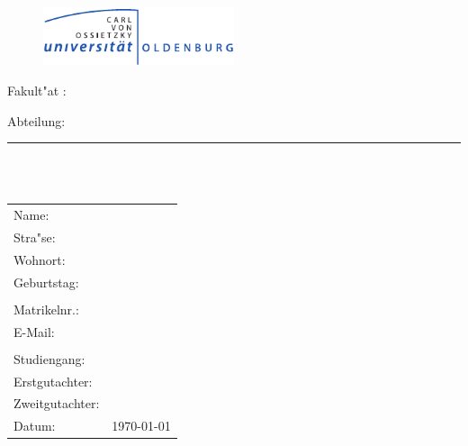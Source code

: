\thispagestyle{empty}
\addtolength{\topmargin}{-\myTopMargin}
\enlargethispage{\myEnlargement}
\vspace*{-2cm}
\begin{figure}[htbp]
	\centering
	\includegraphics[width=0.5\textwidth]{./images/logoUniOL.pdf}
\end{figure}
\begin{center}
	\large{Fakult"at \myFakultaet: \myFachbereich \newline \myInstitut}

	\large{Abteilung: \myAbteilung}    
	\vspace*{0.5cm}

	{\color{grau}\noindent\rule{\textwidth-5cm}{1pt}}

	\vspace*{4.5cm}

	{\textbf{\LARGE \myTitle \\}}
	\vspace*{1.5cm}
	{\Large \myDocumentType\\}
	\vspace*{0.5cm}
	{\large \textit{\texttt{}}}
\end{center}
\vfill
\normalsize{
	\begin{tabular}{ll}
	    Name: & {\myName} \\
		Stra"se: & \myAddress \\
		Wohnort: & \myPlz \ \myCity \\ 
		Geburtstag: & \myBirth \\ \\
	    Matrikelnr.: & {\myMatrNr} \\
		E-Mail: & \myEmail \\ \\
	    Studiengang: & \myStudiengang\\
		Erstgutachter: & \myFirstPruefer \\
		Zweitgutachter: & \mySecondPruefer \\
		Datum: & \today \\
	\end{tabular}
}
\addtolength{\topmargin}{\myTopMargin}
